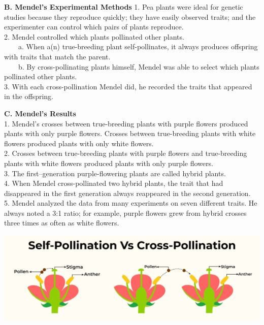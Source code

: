 \documentclass[
]{book}
\begin{document}
\textbf{B. Mendel's Experimental Methods}
1. Pea plants were ideal for genetic studies because they {reproduce} quickly; they have easily observed {traits}; and the experimenter can control which pairs of plants {reproduce}.\\
2. Mendel controlled which plants {pollinated} other plants.\\
    a. When a(n) {true-breeding} plant self-pollinates, it always produces offspring with traits that match the parent.\\
    b. By {cross-pollinating} plants himself, Mendel was able to select which plants pollinated other plants.\\
3. With each cross-pollination Mendel did, he recorded the traits that appeared in the {offspring}.

\textbf{C. Mendel's Results}\\
1. Mendel's crosses between true-breeding plants with purple flowers produced plants with only {purple} flowers. Crosses between true-breeding plants with white flowers produced plants with only {white} flowers.\\
2. Crosses between true-breeding plants with purple flowers and true-breeding plants with white flowers produced plants with only {purple} flowers.\\
3. The first--generation purple-flowering plants are called {hybrid} plants.\\
4. When Mendel cross-pollinated two hybrid plants, the trait that had disappeared in the first generation always {reappeared} in the second generation.\\
5. Mendel analyzed the data from many experiments on seven different {traits}. He always noted a 3:1 {ratio}; for example, purple flowers grew from hybrid crosses {three} times as often as white flowers.

\includegraphics{./img/l9-1.png}
\end{document}
